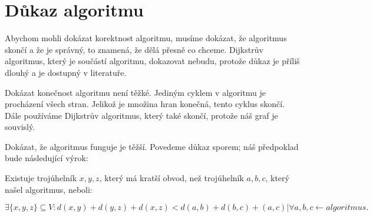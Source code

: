 \section{Důkaz algoritmu}
\label{dukaz_algoritmu}

Abychom mohli dokázat korektnost algoritmu, musíme dokázat, že algoritmus skončí a že je správný, to znamená, že dělá přesně co chceme. Dijkstrův algoritmus, který je součástí algoritmu, dokazovat nebudu, protože důkaz je příliš dlouhý a je dostupný v literatuře.

Dokázat konečnost algoritmu není těžké. Jediným cyklem v algoritmu je procházení všech stran. Jelikož je množina hran konečná, tento cyklus skončí.  Dále používáme Dijkstrův algoritmus, který také skončí, protože náš graf je souvislý. 

Dokázat, že algoritmus funguje je těžší. Povedeme důkaz sporem; náš předpoklad bude následující výrok:

\begin{vyrok}[Předpoklad]
Existuje trojúhelník $x, y, z$, který má kratší obvod, než trojúhelník $a, b, c$, který našel algoritmus, neboli:

\begin{equation*}
    \exists \{x, y, z\}\subseteq V: d(x, y) + d(y, z) + d(x, z) < d(a, b) + d(b, c) + (a, c)| \forall a, b, c \leftarrow algoritmus.
\end{equation*}
\end{vyrok}

